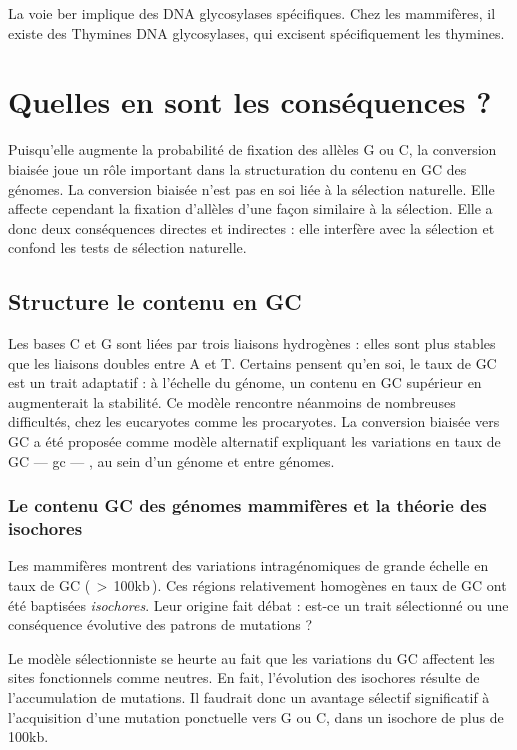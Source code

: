 \documentclass[11pt, oneside]{scrartcl}
\begin{document}
La voie \ac{ber} implique des DNA glycosylases spécifiques. Chez les mammifères,
il existe des Thymines DNA glycosylases, qui excisent spécifiquement les thymines. 

\section{Quelles en sont les conséquences ?}
\label{sec:orgheadline17}
Puisqu'elle augmente la probabilité de fixation des allèles G ou C, la
conversion biaisée joue un rôle important dans la structuration du contenu en
GC des génomes. La conversion biaisée n'est pas en soi liée à la sélection
naturelle. Elle affecte cependant la fixation d'allèles d'une façon similaire
à la sélection\cite{nagylaki_evolution_1983}. Elle a donc deux conséquences
directes et indirectes : elle interfère avec la sélection et confond les tests
de sélection naturelle.
\subsection{Structure le contenu en GC}
\label{sec:orgheadline14}
Les bases C et G sont liées par trois liaisons hydrogènes : elles sont plus
stables que les liaisons doubles entre A et T. Certains pensent qu'en soi, le
taux de GC est un trait adaptatif : à l'échelle du génome, un contenu en GC
supérieur en augmenterait la stabilité. Ce modèle rencontre néanmoins de
nombreuses difficultés, chez les eucaryotes comme les procaryotes. La conversion
biaisée vers GC a été proposée comme modèle alternatif expliquant les variations
en taux de GC --- \ac{gc} --- , au sein d'un génome et entre génomes.

\subsubsection{Le contenu GC des génomes mammifères et la théorie des isochores}
\label{sec:orgheadline12}
Les mammifères montrent des variations intragénomiques de grande échelle en taux
de GC\cite{eyre-walker_evolution_2001} ( \(>\) 100kb ). Ces régions relativement
homogènes en taux de GC ont été baptisées \emph{isochores}. Leur origine fait débat :
est-ce un trait sélectionné ou une conséquence évolutive des patrons de
mutations ?

Le modèle sélectionniste se heurte au fait que les variations du GC affectent
les sites fonctionnels comme neutres. En fait, l'évolution des isochores résulte
de l'accumulation de mutations. Il faudrait donc un avantage sélectif
significatif à l'acquisition d'une mutation ponctuelle vers G ou C, dans un
isochore de plus de 100kb.
\end{document}
